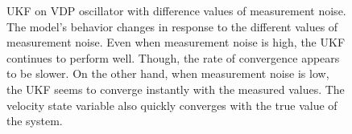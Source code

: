 \begin{figure}[!tbp]
  \centering
  \hfill
  \caption{UKF on VDP oscillator with difference values of measurement noise.
  The model's behavior changes in response to the different values of measurement noise. Even when measurement noise is high, the UKF continues to perform well. Though, the rate of convergence appears to be slower.
On the other hand, when measurement noise is low, the UKF seems to converge instantly with the measured values. The velocity state variable also  quickly converges with the true value of the system.}
\end{figure}

